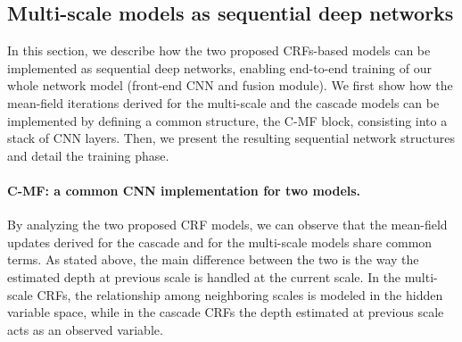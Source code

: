 \documentclass[10pt,twocolumn,letterpaper]{article}
\begin{document}
\subsection{Multi-scale models as sequential deep networks} \label{mean-field}
In this section, we describe how the two proposed CRFs-based models can be implemented
as sequential deep networks, enabling end-to-end training of our whole network model (front-end CNN and fusion module).
We first show how the mean-field iterations derived for the multi-scale and the cascade
models can be implemented by defining a common structure, the C-MF block, {consisting into a stack of CNN layers}. Then, we present the resulting sequential network structures and detail the training phase.
\vspace{-0.3cm}
\paragraph{C-MF: a common {CNN} implementation for two models.} 
By analyzing the two proposed CRF models, we can observe that 
the mean-field updates derived for the cascade and for the multi-scale models
share common terms. As stated above, the main difference between the two is the way 
the estimated depth at previous scale is handled at the current scale. In the multi-scale CRFs, 
the relationship among neighboring scales is modeled in the hidden variable space, while in the cascade CRFs the depth estimated at previous scale acts as an observed variable.
\end{document}
